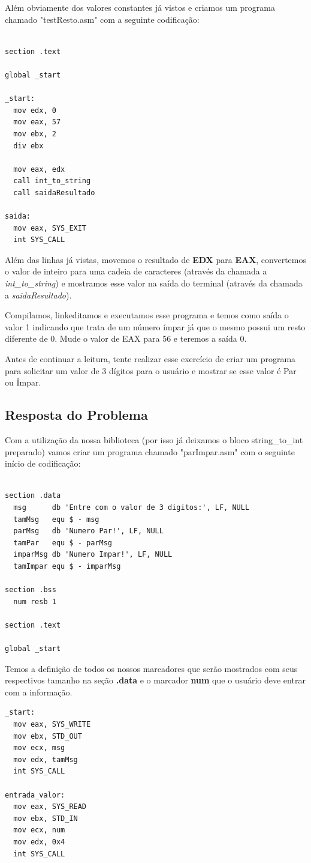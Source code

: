Além obviamente dos valores constantes já vistos e criamos um programa chamado "testResto.asm" com a seguinte codificação:
\begin{lstlisting}[]
%include 'bibliotecaE.inc'

section .text

global _start

_start:
  mov edx, 0
  mov eax, 57
  mov ebx, 2
  div ebx

  mov eax, edx
  call int_to_string
  call saidaResultado

saida: 
  mov eax, SYS_EXIT
  int SYS_CALL
\end{lstlisting}

Além das linhas já vistas, movemos o resultado de \textbf{EDX} para \textbf{EAX}, convertemos o valor de inteiro para uma cadeia de caracteres (através da chamada a \textit{int\_to\_string}) e mostramos esse valor na saída do terminal (através da chamada a \textit{saidaResultado}).

Compilamos, linkeditamos e executamos esse programa e temos como saída o valor 1 indicando que trata de um número ímpar já que o mesmo possui um resto diferente de 0. Mude o valor de EAX para 56 e teremos a saída 0.

Antes de continuar a leitura, tente realizar esse exercício de criar um programa para solicitar um valor de 3 dígitos para o usuário e mostrar se esse valor é Par ou Ímpar.

\subsection{Resposta do Problema}
Com a utilização da nossa biblioteca (por isso já deixamos o bloco string\_to\_int preparado) vamos criar um programa chamado "parImpar.asm" com o seguinte início de codificação:
\begin{lstlisting}[]
%include 'bibliotecaE.inc'

section .data
  msg      db 'Entre com o valor de 3 digitos:', LF, NULL
  tamMsg   equ $ - msg  
  parMsg   db 'Numero Par!', LF, NULL
  tamPar   equ $ - parMsg
  imparMsg db 'Numero Impar!', LF, NULL
  tamImpar equ $ - imparMsg

section .bss
  num resb 1

section .text

global _start
\end{lstlisting}

Temos a definição de todos os nossos marcadores que serão mostrados com seus respectivos tamanho na seção \textbf{.data} e o marcador \textbf{num} que o usuário deve entrar com a informação.
\begin{lstlisting}[]
_start:
  mov eax, SYS_WRITE
  mov ebx, STD_OUT
  mov ecx, msg
  mov edx, tamMsg
  int SYS_CALL

entrada_valor:
  mov eax, SYS_READ
  mov ebx, STD_IN
  mov ecx, num 
  mov edx, 0x4
  int SYS_CALL	
\end{lstlisting}

